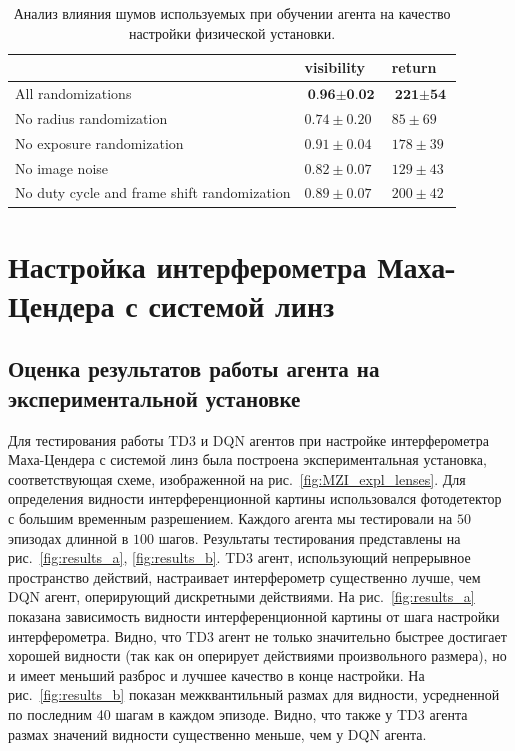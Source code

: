 \begin{table} [htbp]
    \centering
    \begin{threeparttable}
        \caption{Анализ влияния шумов используемых при обучении агента на качество настройки физической установки.}\label{tab:abl}
        \begin{tabular}{| p{10cm} || p{3cm} || p{3cm} |}
            \hline
            \hline
             & visibility & return \\
            \hline
            All randomizations  & $\textbf{0.96} \pm \textbf{0.02}$ & $\textbf{221} \pm \textbf{54}$ \\
            No radius randomization & $0.74 \pm 0.20$ & $85 \pm 69$ \\
            No exposure randomization& $0.91 \pm 0.04$ & $178 \pm 39$ \\
            No image noise & $0.82 \pm 0.07$ & $129 \pm 43$ \\
            No duty cycle and frame shift randomization  &  $0.89 \pm 0.07$ & $200 \pm 42$ \\
            \hline
            \hline
        \end{tabular}
    \end{threeparttable}
\end{table}


\section{Настройка интерферометра Маха-Цендера с системой линз}

\subsection{Оценка результатов работы агента на экспериментальной установке}

Для тестирования работы TD3 и DQN агентов при настройке интерферометра Маха-Цендера с системой линз была построена экспериментальная установка, соответствующая схеме, изображенной на рис.~\ref{fig:MZI_expl_lenses}. Для определения видности интерференционной картины использовался фотодетектор с большим временным разрешением. Каждого агента мы тестировали на $50$ эпизодах длинной в $100$ шагов. Результаты тестирования представлены на рис.~\ref{fig:results_a}, \ref{fig:results_b}. TD3 агент, использующий непрерывное пространство действий, настраивает интерферометр существенно лучше, чем DQN агент, оперирующий дискретными действиями. На рис.~\ref{fig:results_a} показана зависимость видности интерференционной картины от шага настройки интерферометра. Видно, что TD3 агент не только значительно быстрее достигает хорошей видности (так как он оперирует действиями произвольного размера), но и имеет меньший разброс и лучшее качество в конце настройки. На рис.~\ref{fig:results_b} показан межквантильный размах для видности, усредненной по последним 40 шагам в каждом эпизоде. Видно, что также у TD3 агента размах значений видности существенно меньше, чем у DQN агента.

